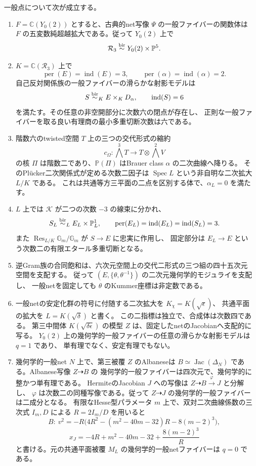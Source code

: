 \begin{theorem}[相対有理性と一般ファイバーの算術]
\label{thm:vi-main-v28}
一般点について次が成立する。
\begin{enumerate}
\item $F=\mathbb C(Y_0(2))$ とすると、古典的net写像 $\Psi$ の一般ファイバーの関数体は
$F$ の五変数純超越拡大である。従って $Y_0(2)$ 上で
\[
 \mathcal R_3\mathrel{\overset{\mathrm{bir}}{\sim}} Y_0(2)\times\mathbb P^5.
\]
\item $K=\mathbb C(\mathcal R_3)$ 上で
\[
 \operatorname{per}(E)=\operatorname{ind}(E)=3,\qquad
 \operatorname{per}(\alpha)=\operatorname{ind}(\alpha)=2.
\]
自己反対関係族の一般ファイバーの滑らかな射影モデルは
\[
 S\mathrel{\overset{\mathrm{bir}}{\sim}}_K E\times_KD_\alpha,\qquad \operatorname{ind}(S)=6
\]
を満たす。その任意の非空開部分に次数六の閉点が存在し、
正則な一般ファイバーを取る良い有理商の最小多重切断次数は六である。
\item 階数六のtwisted空間 $T$ 上の三つの交代形式の縮約
\[
 c_\Omega:\bigwedge^3T\longrightarrow T\otimes\bigwedge^2V
\]
の核 $\Pi$ は階数二であり、$\mathbb P(\Pi)$ はBrauer class $\alpha$ の二次曲線へ降りる。
そのPl\"ucker二次関係式が定める次数二因子は
$\operatorname{Spec}L$ という非自明な二次拡大 $L/K$ である。
これは共通等方三平面の二点を区別する体で、$\alpha_L=0$ を満たす。
\item $L$ 上では $\mathcal K$ が二つの次数 $-3$ の線束に分かれ、
\[
 S_L\mathrel{\overset{\mathrm{bir}}{\sim}}_L E_L\times\mathbb P^1_L,\qquad
 \operatorname{per}(E_L)=\operatorname{ind}(E_L)=\operatorname{ind}(S_L)=3.
\]
また $\operatorname{Res}_{L/K}\mathbb G_m/\mathbb G_m$ が $S\to E$ に忠実に作用し、
固定部分は $E_L\to E$ という次数二の有限エタール多重切断となる。
\item 逆Gram族の合同飽和は、六次元空間上の交代二形式の三つ組の四十五次元空間を支配する。
従って $(E,\{\theta,\theta^{-1}\})$ の二次元幾何学的モジュライを支配し、
一般netを固定しても $\theta$ のKummer座標は非定数である。
\item 一般netの安定化群の符号に付随する二次拡大を $K_\chi=K(\sqrt\epsilon)$、
共通平面の拡大を $L=K(\sqrt\delta)$ と書く。
この二指標は独立で、合成体は次数四である。
第三中間体 $K(\sqrt{\delta\epsilon})$ の模型 $Z$ は、固定したnetのJacobianへ支配的に写る。
$Y_0(2)$ 上の幾何学的一般ファイバーの任意の滑らかな射影モデルは $q=1$ であり、
単有理でなく、安定有理でもない。
\item 幾何学的一般net $N$ 上で、第三被覆 $Z$ のAlbaneseは
$B\simeq\operatorname{Jac}(\Delta_N)$ である。Albanese写像 $Z\dashrightarrow B$ の
幾何学的一般ファイバーは四次元で、幾何学的に整かつ単有理である。
HermiteのJacobian $J$ への写像は $Z\dashrightarrow B\xrightarrow{\varphi}J$ と分解し、
$\varphi$ は次数二の同種写像である。従って $Z\dashrightarrow J$ の幾何学的一般ファイバーは二成分となる。
有限なHesse型パラメータ $m$ 上で、双対二次曲線係数の三次式 $I_m,D$ による
$R=2I_m/D$ を用いると
\[
 B:\ v^2=-R\bigl(4R^2-(m^2-40m-32)R-8(m-2)^3\bigr),
\]
\[
 x_J=-4R+m^2-40m-32+\frac{8(m-2)^3}{R}
\]
と書ける。元の共通平面被覆 $M_L$ の幾何学的一般netファイバーは $q=0$ である。
\end{enumerate}
\end{theorem}

